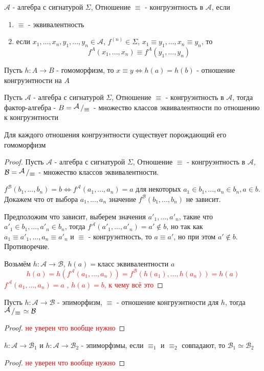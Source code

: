 \documentclass[../main/document.tex]{subfiles}
\begin{document}
\begin{dfn}[Конгруэнтность]
$\mathcal{A}$ - алгебра с сигнатурой $\Sigma$, Отношение $\equiv$ - конгруэнтность в $\mathcal{A}$, если
\begin{enumerate}
\item $\equiv$ - эквивалентность
\item если $x_1,...,x_n,y_1,...,y_n\in \mathcal{A}$, $f^{(n)}\in \Sigma$, $x_1\equiv y_1,...,x_n\equiv y_n$, то
$$f^{A}(x_1,...,x_n)\equiv f^{A}(y_1,...,y_n)$$
\end{enumerate}
\end{dfn}
\begin{cnsq}
Пусть $h:A\to B$ - гомоморфизм, то $x\equiv y\Leftrightarrow h(a)=h(b)$ - отношение конгруэнтности на $A$
\end{cnsq}
\begin{dfn}
Пусть $\mathcal{A}$ - алгебра с сигнатурой $\Sigma$, Отношение $\equiv$ - конгруэнтность в $\mathcal{A}$, тогда фактор-алгебра - $B=\bigslant{\mathcal{A}}{\equiv}$ - множество классов эквивалентности по отношению к конгруэнтности
\end{dfn}
\begin{thm}
Для каждого отношения конгруэнтности существует порождающий его гомоморфизм
\begin{proof}
Пусть $\mathcal{A}$ - алгебра с сигнатурой $\Sigma$, Отношение $\equiv$ - конгруэнтность в $\mathcal{A}$, $\mathcal{B}=\bigslant{\mathcal{A}}{\equiv}$ - множество классов эквивалентности.

$f^{\mathcal{B}}(b_1,...,b_n)=b\Leftrightarrow f^{\mathcal{A}}(a_1,...,a_n)=a$ для некоторых $a_1\in b_1,...,a_n\in b_n,a\in b$. Докажем что от выбора $a_1,...,a_n$ значение $f^{\mathcal{B}}(b_1,...,b_n)$ не зависит.

Предположим что зависит, выберем значения $a'_1,...,a'_n$, такие что $a'_1\in b_1,...,a'_n\in b_n$, тогда $f^{\mathcal{A}}(a'_1,...,a'_n)=a'\not\in b$, но так как $a_1\equiv a'_1,...,a_n\equiv a'_n$ и $\equiv$ - конгруэнтность, то $a\equiv a'$, но при этом $a'\not\in b$. Противоречие.

Возьмём $h:\mathcal{A}\to \mathcal{B}$, $h(a)=$класс эквивалентности $a$
\textcolor{red}{$$h(a)=h(f^{\mathcal{A}}(a_1,...,a_n))=f^{\mathcal{B}}(h(a_1),...,h(a_n))=h(a)$$
$f^{\mathcal{A}}(a_1,...,a_n)=a$
, $h(a)=b$, к чему всё это}
\end{proof}
\end{thm}

\begin{thm}
Пусть $h:\mathcal{A}\to \mathcal{B}$ - эпиморфизм, $\equiv$ - отношение конгруэнтности для $h$, тогда $\bigslant{\mathcal{A}}{\equiv}\simeq \mathcal{B}$
\begin{proof}
\textcolor{red}{не уверен что вообще нужно}
\end{proof}
\end{thm}
\begin{cnsq}
$h:\mathcal{A}\to \mathcal{B}_1$ и $h:\mathcal{A}\to \mathcal{B}_2$ - эпиморфзмы, если $\equiv_1$ и $\equiv_2$ совпадают, то $\mathcal{B}_1\simeq \mathcal{B}_2$
\begin{proof}
\textcolor{red}{не уверен что вообще нужно}
\end{proof}
\end{cnsq}
\end{document}
